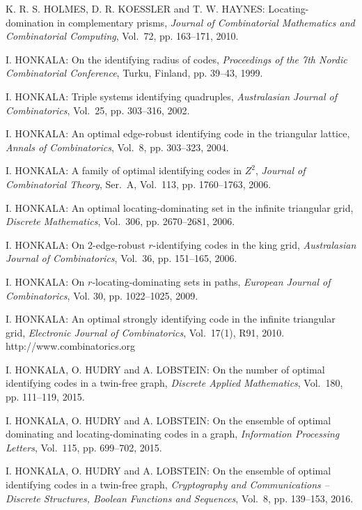 \begin{thebibliography}{999}
K. R. S. HOLMES, D. R. KOESSLER and T. W. HAYNES: Locating-domination in
complementary prisms, {\it Journal of Combinatorial Mathematics and Combinatorial
Computing}, Vol.~72, pp. 163--171, 2010.

I. HONKALA: On the identifying radius of codes, {\it Proceedings of the 7th Nordic Combinatorial Conference}, Turku, Finland, pp. 39--43, 1999.

I. HONKALA: Triple systems identifying quadruples, {\it Australasian Journal of Combinatorics}, Vol.~25, pp. 303--316, 2002.

I. HONKALA: An optimal edge-robust identifying code in the triangular lattice, {\it Annals of Combinatorics}, Vol.~8, pp. 303--323, 2004.

I. HONKALA: A family of optimal identifying codes in $Z^2$, {\it Journal of Combinatorial Theory}, Ser.~A, Vol.~113, pp. 1760--1763, 2006.

I. HONKALA: An optimal locating-dominating set in the infinite triangular grid, {\it Discrete Mathematics}, Vol.~306, pp. 2670--2681, 2006.

I. HONKALA: On 2-edge-robust $r$-identifying codes in the king grid, {\it Australasian Journal of Combinatorics}, Vol.~36, pp. 151--165, 2006.

I. HONKALA: On $r$-locating-dominating sets in paths, {\it European Journal of Combinatorics}, Vol. 30, pp. 1022--1025, 2009. 

I. HONKALA: An optimal strongly identifying code in the infinite triangular grid, {\it Electronic Journal of Combinatorics}, Vol.~17(1), R91, 2010.\\
http://www.combinatorics.org

 I. HONKALA, O. HUDRY and A. LOBSTEIN: On the number of optimal identifying codes in a twin-free graph, {\it Discrete Applied Mathematics}, Vol.~180, pp. 111--119, 2015.

 I. HONKALA, O. HUDRY and A. LOBSTEIN: On the ensemble of optimal dominating and locating-dominating codes in a graph, {\it Information Processing Letters}, Vol.~115, pp. 699--702, 2015.

 I. HONKALA, O. HUDRY and A. LOBSTEIN: On the ensemble of optimal identifying codes in a twin-free graph, {\it Cryptography and Communications -- Discrete Structures, Boolean Functions and Sequences}, Vol.~8, pp. 139--153, 2016.


\end{thebibliography}
